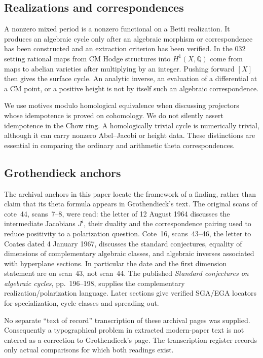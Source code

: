 \documentclass[11pt]{article}
\newcommand{\Q}{\mathbb Q}\newcommand{\C}{\mathbb C}\newcommand{\Z}{\mathbb Z}\newcommand{\R}{\mathbb R}\newcommand{\A}{\mathbb A}\newcommand{\OO}{\mathcal O}
\theoremstyle{definition}\newtheorem{definition}[theorem]{Definition}\newtheorem{remark}[theorem]{Remark}
\begin{document}
\subsection{Realizations and correspondences}
A nonzero mixed period is a nonzero functional on a Betti realization. It produces an algebraic cycle only after an algebraic morphism or correspondence has been constructed and an extraction criterion has been verified. In the 032 setting rational maps from CM Hodge structures into $H^1(X,\Q)$ come from maps to abelian varieties after multiplying by an integer. Pushing forward $[X]$ then gives the surface cycle. An analytic inverse, an evaluation of a differential at a CM point, or a positive height is not by itself such an algebraic correspondence.

We use motives modulo homological equivalence when discussing projectors whose idempotence is proved on cohomology. We do not silently assert idempotence in the Chow ring. A homologically trivial cycle is numerically trivial, although it can carry nonzero Abel--Jacobi or height data. These distinctions are essential in comparing the ordinary and arithmetic theta correspondences.

\subsection{Grothendieck anchors}
The archival anchors in this paper locate the framework of a finding, rather than claim that its theta formula appears in Grothendieck's text. The original scans of cote~44, scans~7--8, were read: the letter of 12 August 1964 discusses the intermediate Jacobians $J^i$, their duality and the correspondence pairing used to reduce positivity to a polarization question. Cote~16, scans~43--46, the letter to Coates dated 4 January 1967, discusses the standard conjectures, equality of dimensions of complementary algebraic classes, and algebraic inverses associated with hyperplane sections. In particular the date and the first dimension statement are on scan~43, not scan~44. The published \emph{Standard conjectures on algebraic cycles}, pp.~196--198, supplies the complementary realization/polarization language. Later sections give verified SGA/EGA locators for specialization, cycle classes and spreading out.

No separate ``text of record'' transcription of these archival pages was supplied. Consequently a typographical problem in extracted modern-paper text is not entered as a correction to Grothendieck's page. The transcription register records only actual comparisons for which both readings exist.
\end{document}
